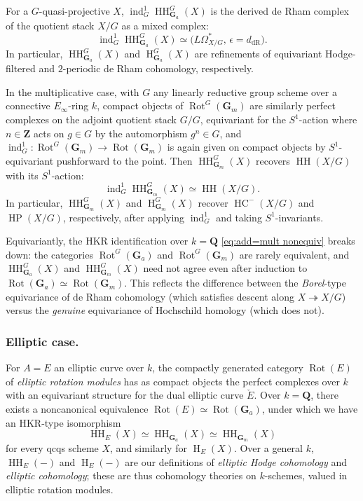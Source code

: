 \documentclass[12pt, oneside]{amsart}
\numberwithin{equation}{section}
\theoremstyle{remark}
\theoremstyle{plain}
\newcommand{\GGa}{\mathbf{G}_{a}}
\newcommand{\GGm}{\mathbf{G}_{m}}
\newcommand{\bZ}{\mathbf{Z}}
\newcommand{\bQ}{\mathbf{Q}}
\newcommand{\HH}{\operatorname{HH}}
\newcommand{\Hcoh}{\operatorname{H}}
\newcommand{\Rot}{\operatorname{Rot}}
\begin{document}
For a $G$-quasi-projective $X$, $\operatorname{ind}_G^1\HH_{\GGa}^G(X)$ is the derived de Rham complex of the quotient stack $X/G$ as a mixed complex:
\[
  \operatorname{ind}_G^1\HH^G_{\GGa}(X) \simeq \bigl(L\Omega^*_{X/G},\, \epsilon = d_{\mathrm{dR}}\bigr).
\]
In particular, $\HH^G_{\GGa}(X)$ and $\Hcoh_{\GGa}^G(X)$ are refinements of equivariant Hodge-filtered and $2$-periodic de Rham cohomology, respectively.

In the multiplicative case, with $G$ any linearly reductive group scheme over a connective $E_\infty$-ring $k$, compact objects of $\Rot^G(\GGm)$ are similarly perfect complexes on the adjoint quotient stack $G/G$, equivariant for the $S^1$-action where $n \in \bZ$ acts on $g \in G$ by the automorphism $g^n \in G$, and $\operatorname{ind}_G^1 : \Rot^G(\GGm) \to \Rot(\GGm)$ is again given on compact objects by $S^1$-equivariant pushforward to the point.
Then $\HH^G_{\GGm}(X)$ recovers $\operatorname{HH}(X/G)$ with its $S^1$-action:
\[
  \operatorname{ind}_G^1\HH^G_{\GGm}(X) \simeq \operatorname{HH}(X/G).
\]
In particular, $\HH^G_{\GGm}(X)$ and $\Hcoh^G_{\GGm}(X)$ recover $\operatorname{HC}^-(X/G)$ and $\operatorname{HP}(X/G)$, respectively, after applying $\operatorname{ind}_G^1$ and taking $S^1$-invariants.

Equivariantly, the HKR identification over $k=\bQ$ \eqref{eq:add=mult nonequiv} breaks down: the categories $\Rot^G(\GGa)$ and $\Rot^G(\GGm)$ are rarely equivalent, and $\HH_{\GGa}^G(X)$ and $\HH_{\GGm}^G(X)$ need not agree even after induction to $\Rot(\GGa) \simeq \Rot(\GGm)$.
This reflects the difference between the \emph{Borel}-type equivariance of de Rham cohomology (which satisfies descent along $X \twoheadrightarrow X/G$) versus the \emph{genuine} equivariance of Hochschild homology (which does not).

\subsubsection{Elliptic case.}\label{sssec:intro/coh/ell}
For $A = E$ an elliptic curve over $k$, the compactly generated category $\Rot(E)$ of \emph{elliptic rotation modules} has as compact objects the perfect complexes over $k$ with an equivariant structure for the dual elliptic curve $\check{E}$.
Over $k=\bQ$, there exists a noncanonical equivalence $\Rot(E) \simeq \Rot(\GGa)$, under which we have an HKR-type isomorphism
\[
  \HH_E(X) \simeq \HH_{\GGa}(X) \simeq \HH_{\GGm}(X)
\]
for every qcqs scheme $X$, and similarly for $\Hcoh_E(X)$.
Over a general $k$, $\HH_E(-)$ and $\Hcoh_E(-)$ are our definitions of \emph{elliptic Hodge cohomology} and \emph{elliptic cohomology}; these are thus cohomology theories on $k$-schemes, valued in elliptic rotation modules.
\end{document}
